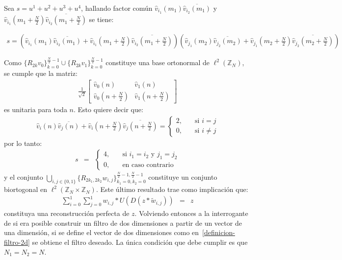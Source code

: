 \par Sea $s=u^1+u^2+u^3+u^4$, hallando factor com\'un $\hat{v}_{i_1}(m_1)\overline{\hat{v}_{i_2}(m_1)}$ y\linebreak $\hat{v}_{i_1}\left(m_1+\frac{N}{2}\right)\overline{\hat{v}_{i_2}\left(m_1+\frac{N}{2}\right)}$ se tiene:
\begin{scriptsize}
\begin{eqnarray}
s=\left(\hat{v}_{i_1}(m_1)\overline{\hat{v}_{i_2}(m_1)}+\hat{v}_{i_1}\left(m_1+\frac{N}{2}\right)\overline{\hat{v}_{i_2}\left(m_1+\frac{N}{2}\right)}\right)\left(\hat{v}_{j_1}(m_2)\overline{\hat{v}_{j_2}(m_2)}+\hat{v}_{j_1}\left(m_2+\frac{N}{2}\right)\overline{\hat{v}_{j_2}\left(m_2+\frac{N}{2}\right)}\right)\nonumber
\end{eqnarray}
\end{scriptsize}
\par Como $\{R_{2k}v_0\}_{k=0}^{\frac{N}{2}-1}\cup\{R_{2k}v_1\}_{k=0}^{\frac{N}{2}-1}$ constituye una base ortonormal de $\ell^2(\mathbb{Z}_N)$, se cumple que la matriz:
\begin{eqnarray}
\frac{1}{\sqrt{2}}\left[\begin{array}{cc}
\hat{v}_0(n)&\hat{v}_1(n)\\
\hat{v}_0\left(n+\frac{N}{2}\right)&\hat{v}_1\left(n+\frac{N}{2}\right)
\end{array}\right]\nonumber
\end{eqnarray}
es unitaria para toda $n$. Esto quiere decir que:
\begin{eqnarray}
\hat{v}_i(n)\overline{\hat{v}_j(n)}+\hat{v}_i\left(n+\frac{N}{2}\right)\overline{\hat{v}_j\left(n+\frac{N}{2}\right)}=\left\{\begin{array}{ll}
2,&\quad\mbox{si $i=j$}\\
0,&\quad\mbox{si $i\neq j$}
\end{array}\right.\nonumber
\end{eqnarray}
por lo tanto:
\begin{eqnarray}
s&=&\left\{\begin{array}{ll}
4,&\quad\mbox{si $i_1=i_2$ y $j_1=j_2$}\\
0,&\quad\mbox{en caso contrario}
\end{array}\right.\nonumber
\end{eqnarray}
y el conjunto $\displaystyle\bigcup_{i,j\in\{0,1\}}\{R_{2k_1,2k_2}w_{i,j}\}_{k_1=0,k_2=0}^{\frac{N}{2}-1,\frac{N}{2}-1}$ constituye un conjunto biortogonal en $\ell^2(\mathbb{Z}_N\times\mathbb{Z}_N)$. Este \'ultimo resultado trae como implicaci\'on que:
\begin{eqnarray}
\sum_{i=0}^1\sum_{j=0}^1w_{i,j}\ast U(D(z\ast\tilde{w}_{i,j}))&=&z\nonumber
\end{eqnarray}
constituya una reconstrucci\'on perfecta de $z$. Volviendo entonces a la interrogante de si era posible construir un filtro de dos dimensiones a partir de un vector de una dimensi\'on, si se define el vector de dos dimensiones como en~\ref{definicion-filtro-2d} se obtiene el filtro deseado. La \'unica condici\'on que debe cumplir es que $N_1=N_2=N$.

